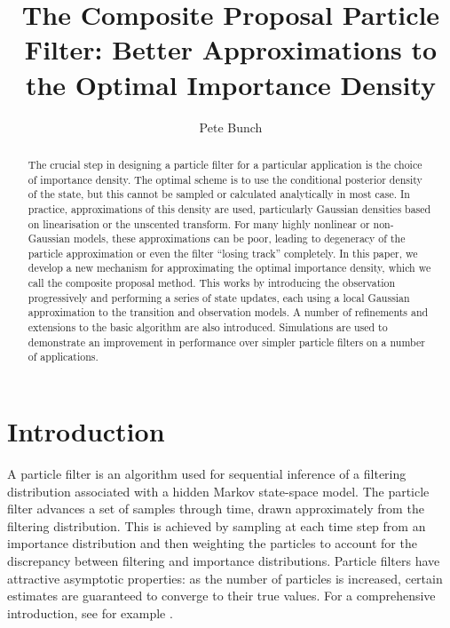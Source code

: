 \documentclass{article}
\title{The Composite Proposal Particle Filter: Better Approximations to the Optimal Importance Density}
\author{Pete Bunch}
\begin{document}
\maketitle

\begin{abstract}
The crucial step in designing a particle filter for a particular application is the choice of importance density. The optimal scheme is to use the conditional posterior density of the state, but this cannot be sampled or calculated analytically in most case. In practice, approximations of this density are used, particularly Gaussian densities based on linearisation or the unscented transform. For many highly nonlinear or non-Gaussian models, these approximations can be poor, leading to degeneracy of the particle approximation or even the filter ``losing track'' completely. In this paper, we develop a new mechanism for approximating the optimal importance density, which we call the composite proposal method. This works by introducing the observation progressively and performing a series of state updates, each using a local Gaussian approximation to the transition and observation models. A number of refinements and extensions to the basic algorithm are also introduced. Simulations are used to demonstrate an improvement in performance over simpler particle filters on a number of applications.
\end{abstract}






\section{Introduction}

A particle filter is an algorithm used for sequential inference of a filtering distribution associated with a hidden Markov state-space model. The particle filter advances a set of samples through time, drawn approximately from the filtering distribution. This is achieved by sampling at each time step from an importance distribution and then weighting the particles to account for the discrepancy between filtering and importance distributions. Particle filters have attractive asymptotic properties: as the number of particles is increased, certain estimates are guaranteed to converge to their true values. For a comprehensive introduction, see for example \citep{Cappe2007,Doucet2009}.
\end{document}

